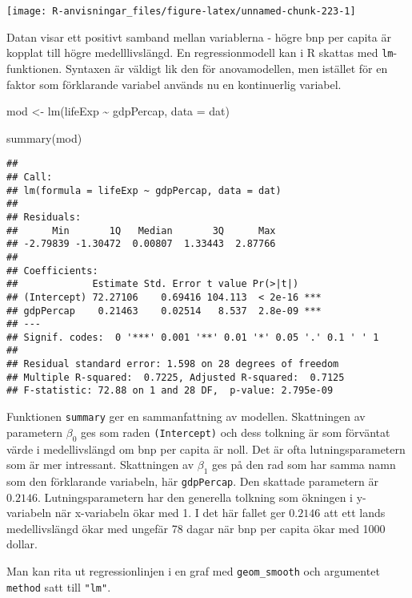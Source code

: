 \documentclass[
]{book}
\newenvironment{Shaded}{\begin{snugshade}}{\end{snugshade}}
\newcommand{\AttributeTok}[1]{\textcolor[rgb]{0.77,0.63,0.00}{#1}}
\newcommand{\FunctionTok}[1]{\textcolor[rgb]{0.00,0.00,0.00}{#1}}
\newcommand{\NormalTok}[1]{#1}
\newcommand{\OtherTok}[1]{\textcolor[rgb]{0.56,0.35,0.01}{#1}}
\newcommand{\SpecialCharTok}[1]{\textcolor[rgb]{0.00,0.00,0.00}{#1}}
\theoremstyle{definition}
\theoremstyle{definition}
\theoremstyle{definition}
\theoremstyle{definition}
\theoremstyle{remark}
\begin{document}
\begin{center}\texttt{[image: R-anvisningar\_files/figure-latex/unnamed-chunk-223-1]} \end{center}

Datan visar ett positivt samband mellan variablerna - högre bnp per capita är kopplat till högre medelllivslängd. En regressionmodell kan i R skattas med \texttt{lm}-funktionen. Syntaxen är väldigt lik den för anovamodellen, men istället för en faktor som förklarande variabel används nu en kontinuerlig variabel.

\begin{Shaded}
\begin{Highlighting}[]
\NormalTok{mod }\OtherTok{\textless{}{-}} \FunctionTok{lm}\NormalTok{(lifeExp }\SpecialCharTok{\textasciitilde{}}\NormalTok{ gdpPercap, }\AttributeTok{data =}\NormalTok{ dat)}

\FunctionTok{summary}\NormalTok{(mod)}
\end{Highlighting}
\end{Shaded}

\begin{verbatim}
## 
## Call:
## lm(formula = lifeExp ~ gdpPercap, data = dat)
## 
## Residuals:
##      Min       1Q   Median       3Q      Max 
## -2.79839 -1.30472  0.00807  1.33443  2.87766 
## 
## Coefficients:
##             Estimate Std. Error t value Pr(>|t|)    
## (Intercept) 72.27106    0.69416 104.113  < 2e-16 ***
## gdpPercap    0.21463    0.02514   8.537  2.8e-09 ***
## ---
## Signif. codes:  0 '***' 0.001 '**' 0.01 '*' 0.05 '.' 0.1 ' ' 1
## 
## Residual standard error: 1.598 on 28 degrees of freedom
## Multiple R-squared:  0.7225, Adjusted R-squared:  0.7125 
## F-statistic: 72.88 on 1 and 28 DF,  p-value: 2.795e-09
\end{verbatim}

Funktionen \texttt{summary} ger en sammanfattning av modellen. Skattningen av parametern \(\beta_0\) ges som raden \texttt{(Intercept)} och dess tolkning är som förväntat värde i medellivslängd om bnp per capita är noll. Det är ofta lutningsparametern som är mer intressant. Skattningen av \(\beta_1\) ges på den rad som har samma namn som den förklarande variabeln, här \texttt{gdpPercap}. Den skattade parametern är \(0.2146\). Lutningsparametern har den generella tolkning som ökningen i y-variabeln när x-variabeln ökar med 1. I det här fallet ger \(0.2146\) att ett lands medellivslängd ökar med ungefär 78 dagar när bnp per capita ökar med 1000 dollar.

Man kan rita ut regressionlinjen i en graf med \texttt{geom\_smooth} och argumentet \texttt{method} satt till \texttt{"lm"}.
\end{document}
